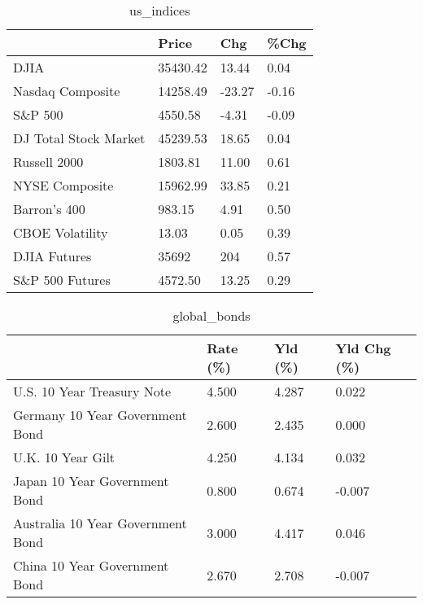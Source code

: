 \documentclass{article}%
\begin{document}
%


\begin{table}[htbp]%
\caption{us\_indices}%
\centering%
\begin{adjustbox}{width=1\textwidth}%
\begin{tabular}{llll}
\toprule
                      &    Price &    Chg &  \%Chg \\
\midrule
                 DJIA & 35430.42 &  13.44 &  0.04 \\
     Nasdaq Composite & 14258.49 & -23.27 & -0.16 \\
              S\&P 500 &  4550.58 &  -4.31 & -0.09 \\
DJ Total Stock Market & 45239.53 &  18.65 &  0.04 \\
         Russell 2000 &  1803.81 &  11.00 &  0.61 \\
       NYSE Composite & 15962.99 &  33.85 &  0.21 \\
         Barron's 400 &   983.15 &   4.91 &  0.50 \\
      CBOE Volatility &    13.03 &   0.05 &  0.39 \\
         DJIA Futures &    35692 &    204 &  0.57 \\
      S\&P 500 Futures &  4572.50 &  13.25 &  0.29 \\
\bottomrule
\end{tabular}
%
\end{adjustbox}%
\end{table}

%


\begin{table}[htbp]%
\caption{global\_bonds}%
\centering%
\begin{adjustbox}{width=1\textwidth}%
\begin{tabular}{llll}
\toprule
                                  & Rate (\%) & Yld (\%) & Yld Chg (\%) \\
\midrule
       U.S. 10 Year Treasury Note &    4.500 &   4.287 &       0.022 \\
  Germany 10 Year Government Bond &    2.600 &   2.435 &       0.000 \\
                U.K. 10 Year Gilt &    4.250 &   4.134 &       0.032 \\
    Japan 10 Year Government Bond &    0.800 &   0.674 &      -0.007 \\
Australia 10 Year Government Bond &    3.000 &   4.417 &       0.046 \\
    China 10 Year Government Bond &    2.670 &   2.708 &      -0.007 \\
\bottomrule
\end{tabular}
%
\end{adjustbox}%
\end{table}
\end{document}
